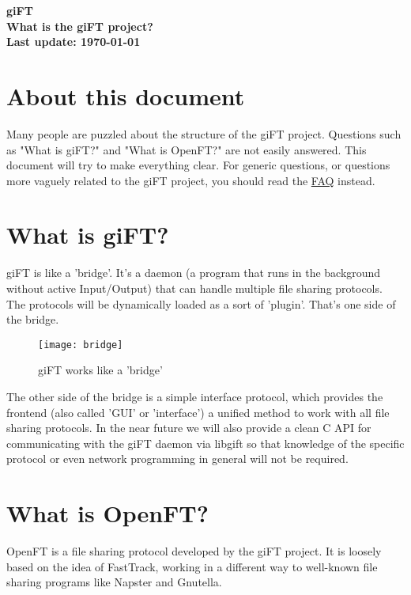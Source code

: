 \documentclass[10pt]{article}
\begin{document}
\begin{center}
\textsf{\textbf{\Huge{giFT}\\ \huge{What is the giFT project?}\\
\normalsize{Last update: \today}}}
\end{center}

\tableofcontents

\setlength{\parskip}{1.4ex}

\section{About this document}
Many people are puzzled about the structure of the giFT project. Questions
such as "What is giFT?" and "What is OpenFT?" are not easily answered. This
document will try to make everything clear. For generic questions, or questions
more vaguely related to the giFT project, you should read the
\href{http://gift.sourceforge.net/docs.php?document=faq.html}{FAQ} instead.

\section{What is giFT?}
giFT is like a 'bridge'. It's a daemon (a program that runs in the background
without active Input/Output) that can handle multiple file sharing protocols.
The protocols will be dynamically loaded as a sort of 'plugin'.  That's one
side of the bridge.

\begin{figure}[bh]
  \begin{center}
    \texttt{[image: bridge]}
  \end{center}
  \caption{giFT works like a 'bridge'}
\end{figure}

The other side of the bridge is a simple interface protocol, which provides the
frontend (also called 'GUI' or 'interface') a unified method to work with all
file sharing protocols.  In the near future we will also provide a clean C API
for communicating with the giFT daemon via libgift so that knowledge of the
specific protocol or even network programming in general will not be required.

\section{What is OpenFT?}
OpenFT is a file sharing protocol developed by the giFT project. It is loosely
based on the idea of FastTrack, working in a different way to well-known file
sharing programs like Napster and Gnutella.
\end{document}
